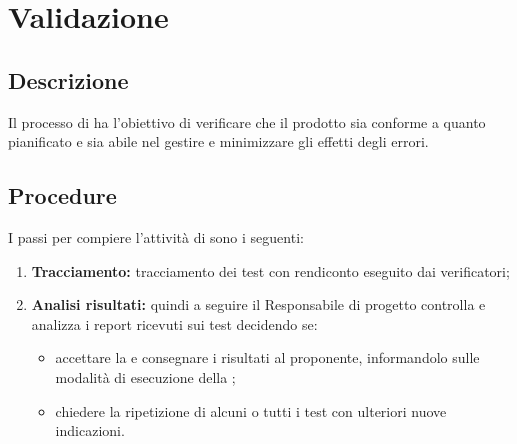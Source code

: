 \documentclass[NormeDiProgetto.tex]{subfiles}
\begin{document}
	\section{Validazione}
	\subsection{Descrizione}
		Il processo di  ha l'obiettivo di verificare che il prodotto sia conforme a quanto pianificato e sia abile nel gestire e minimizzare gli effetti degli errori.
	\subsection{Procedure}
		I passi per compiere l’attività di  sono i seguenti:
		\begin{enumerate}
			\item \textbf{Tracciamento:} tracciamento dei test con rendiconto eseguito dai verificatori;
			\item \textbf{Analisi risultati:} quindi a seguire il Responsabile di progetto controlla e analizza i report ricevuti sui test decidendo se:
			\begin{itemize}
				\item accettare la  e consegnare i risultati al proponente, informandolo sulle modalità di esecuzione della ;
				\item chiedere la ripetizione di alcuni o tutti i test con ulteriori nuove indicazioni.
			\end{itemize}
		\end{enumerate}

	 
	
	
\end{document}
